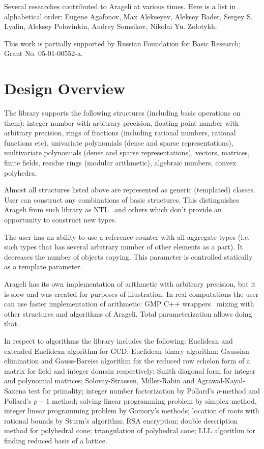\documentclass{llncs}
\begin{document}
Several researches contributed to Arageli at various times. Here is a list in alphabetical order: Eugene Agafonov, Max Alekseyev, Aleksey Bader, Sergey S. Lyalin, Aleksey Polovinkin, Andrey Somsikov, Nikolai Yu. Zolotykh.

This work is partially supported by Russian Foundation for Basic Research; Grant No. 05-01-00552-a.



\section{Design Overview}

The library supports the following structures (including basic operations on them): integer number with arbitrary precision, floating point number with arbitrary precision, rings of fractions (including rational numbers, rational functions etc), univariate polynomials (dense and sparse representations), multivariate polynomials (dense and sparse representations), vectors, matrices, finite fields, residue rings (modular arithmetic), algebraic numbers, convex polyhedra.

Almost all structures listed above are represented as generic (templated) classes. User can construct any combinations of basic structures. This distinguishes Arageli from such library as NTL~\cite{NTL} and others which don't provide an opportunity to construct new types.

The user has an ability to use a reference counter with all aggregate types (i.e. such types that has several arbitrary number of other elements as a part). It decreases the number of objects copying. This parameter is controlled statically as a template parameter.

Arageli has its own implementation of arithmetic with arbitrary precision, but it is slow and was created for purposes of illustration. In real computations the user can use faster implementation of arithmetic: GMP C++ wrappers~\cite{GMP} mixing with other structures and algorithms of Arageli. Total parameterization allows doing that.

In respect to algorithms the library includes the following: Euclidean and extended Euclidean algorithm for GCD; Euclidean binary algorithm; Gaussian elimination and Gauss-Bareiss algorithm for the reduced row echelon form of a matrix for field and integer domain respectively; Smith diagonal form for integer and polynomial matrices; Solovay-Strassen, Miller-Rabin and Agrawal-Kayal-Saxena test for primality; integer number factorization by Pollard's $\rho$-method and Pollard's $p-1$ method; solving linear programming problem by simplex method, integer linear programming problem by Gomory's methods; location of roots with rational bounds by Sturm's algorithm; RSA encryption; double description method for polyhedral cone; triangulation of polyhedral cone; LLL algorithm for finding reduced basis of a lattice.
\end{document}
